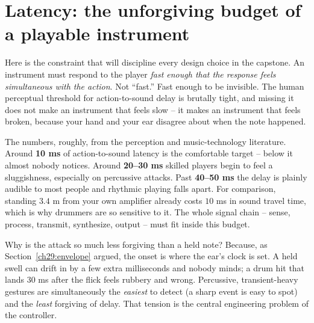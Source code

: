 \section{Latency: the unforgiving budget of a playable instrument}
\label{ch29:latency}

Here is the constraint that will discipline every design choice in the capstone. An instrument must
respond to the player \emph{fast enough that the response feels simultaneous with the action}. Not
``fast.'' Fast enough to be invisible. The human perceptual threshold for action-to-sound delay is
brutally tight, and missing it does not make an instrument that feels slow -- it makes an instrument
that feels broken, because your hand and your ear disagree about when the note happened.

\begin{focusbox}
The numbers, roughly, from the perception and music-technology literature. Around \textbf{10 ms} of
action-to-sound latency is the comfortable target -- below it almost nobody notices. Around
\textbf{20--30 ms} skilled players begin to feel a sluggishness, especially on percussive
attacks. Past \textbf{40--50 ms} the delay is plainly audible to most people and rhythmic playing
falls apart. For comparison, standing $3.4$ m from your own amplifier already costs $10$ ms in sound
travel time, which is why drummers are so sensitive to it. The whole signal chain -- sense, process,
transmit, synthesize, output -- must fit inside this budget.
\end{focusbox}

Why is the attack so much less forgiving than a held note? Because, as Section~\ref{ch29:envelope}
argued, the onset is where the ear's clock is set. A held swell can drift in by a few extra
milliseconds and nobody minds; a drum hit that lands $30$ ms after the flick feels rubbery and wrong.
Percussive, transient-heavy gestures are simultaneously the \emph{easiest} to detect (a sharp event
is easy to spot) and the \emph{least} forgiving of delay. That tension is the central engineering
problem of the controller.

